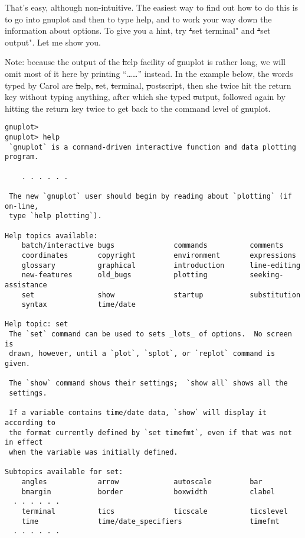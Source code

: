 \carol
That's easy, although non-intuitive.  The easiest way to find out
how to do this is to go into gnuplot and then to type help, and to
work your way down the information about options.  To give you a hint,
try {\st "set terminal"} and {\st "set output"}.  Let me show you.

\cba

Note: because the output of the {\st help} facility of {\st gnuplot}
is rather long, we will omit most of it here by printing ``\dots\dots''
instead.  In the example below, the words typed by Carol are {\st help},
{\st set}, {\st terminal}, {\st postscript}, then she twice hit the return
key without typing anything, after which she typed {\st output},
followed again by hitting the return key twice to get back to the
command level of gnuplot.

\begin{small}
\begin{verbatim}
gnuplot> 
gnuplot> help
 `gnuplot` is a command-driven interactive function and data plotting program.

    . . . . . .

 The new `gnuplot` user should begin by reading about `plotting` (if on-line,
 type `help plotting`).

Help topics available:
    batch/interactive bugs              commands          comments
    coordinates       copyright         environment       expressions
    glossary          graphical         introduction      line-editing
    new-features      old_bugs          plotting          seeking-assistance
    set               show              startup           substitution
    syntax            time/date

Help topic: set
 The `set` command can be used to sets _lots_ of options.  No screen is
 drawn, however, until a `plot`, `splot`, or `replot` command is given.

 The `show` command shows their settings;  `show all` shows all the
 settings.

 If a variable contains time/date data, `show` will display it according to
 the format currently defined by `set timefmt`, even if that was not in effect
 when the variable was initially defined.

Subtopics available for set:
    angles            arrow             autoscale         bar
    bmargin           border            boxwidth          clabel
  . . . . . .
    terminal          tics              ticscale          ticslevel
    time              time/date_specifiers                timefmt
  . . . . . .


\end{verbatim}
\end{small}
